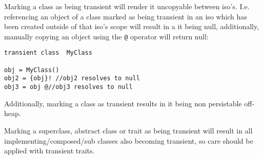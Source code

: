 \documentclass[conc-doc]{subfiles}
\begin{document}
Marking a class as being transient will render it uncopyable between iso’s. I.e. referencing an object of a class marked as being transient in an iso which has been created outside of that iso’s scope will result in a it being null, additionally, manually copying an object using the \lstinline{@} operator will return null:

\begin{lstlisting}
transient class  MyClass

obj = MyClass()
obj2 = {obj}! //obj2 resolves to null
obj3 = obj @//obj3 resolves to null
\end{lstlisting}

Additionally, marking a class as transient results in it being non persistable off-heap.

Marking a superclass, abstract class or trait as being transient will result in all implementing/composed/sub classes also becoming transient, so care should be applied with transient traits.
\end{document}
